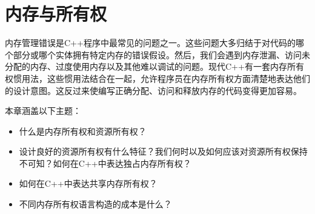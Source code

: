 \chapter{内存与所有权}

内存管理错误是C++程序中最常见的问题之一。这些问题大多归结于对代码的哪个部分或哪个实体拥有特定内存的错误假设。然后，我们会遇到内存泄漏、访问未分配的内存、过度使用内存以及其他难以调试的问题。现代C++有一套内存所有权惯用法，这些惯用法结合在一起，允许程序员在内存所有权方面清楚地表达他们的设计意图。这反过来使编写正确分配、访问和释放内存的代码变得更加容易。

本章涵盖以下主题：

\begin{itemize}
\item
  什么是内存所有权和资源所有权？
\item
  设计良好的资源所有权有什么特征？我们何时以及如何应该对资源所有权保持不可知？如何在C++中表达独占内存所有权？
\item
  如何在C++中表达共享内存所有权？
\item
  不同内存所有权语言构造的成本是什么？
\end{itemize}

